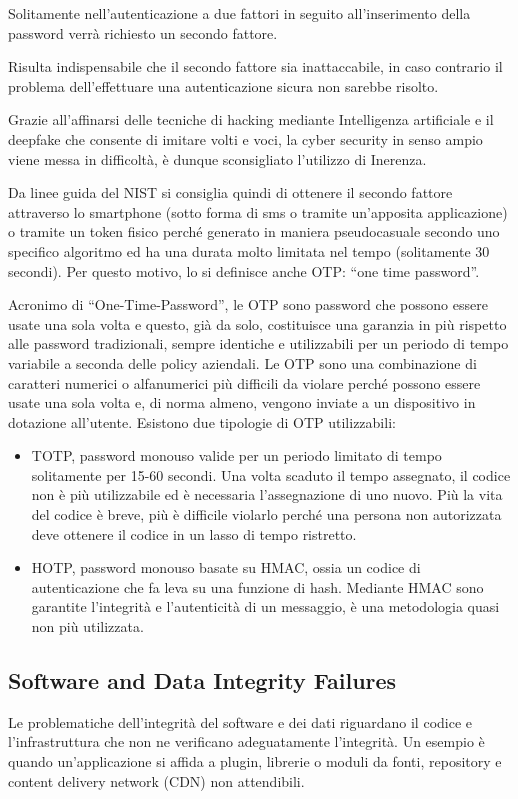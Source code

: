 Solitamente nell’autenticazione a due fattori in seguito all’inserimento della password verrà richiesto un secondo fattore. 

Risulta indispensabile che il secondo fattore sia inattaccabile, in caso contrario il problema dell’effettuare una autenticazione sicura non sarebbe risolto. 

Grazie all’affinarsi delle tecniche di hacking mediante Intelligenza artificiale e il deepfake che consente di imitare volti e voci, la cyber security in senso ampio viene messa in difficoltà, è dunque sconsigliato l’utilizzo di Inerenza.

Da linee guida del NIST si consiglia quindi di ottenere il  secondo fattore attraverso lo smartphone (sotto forma di sms o tramite un’apposita applicazione) o tramite un token fisico perché generato in maniera pseudocasuale secondo uno specifico algoritmo ed ha una durata molto limitata nel tempo (solitamente 30 secondi).  Per questo motivo, lo si definisce anche OTP: “one time password”.

Acronimo di “One-Time-Password”, le OTP sono password che possono essere usate una sola volta e questo, già da solo, costituisce una garanzia in più rispetto alle password tradizionali, sempre identiche e utilizzabili per un periodo di tempo variabile a seconda delle policy aziendali. Le OTP sono una combinazione di caratteri numerici o alfanumerici più difficili da violare perché possono essere usate una sola volta e, di norma almeno, vengono inviate a un dispositivo in dotazione all’utente.
Esistono due tipologie di OTP utilizzabili:
\begin{itemize}
    \item TOTP, password monouso valide per un periodo limitato di tempo solitamente per 15-60 secondi. Una volta scaduto il tempo assegnato, il codice non è più utilizzabile ed è necessaria l’assegnazione di uno nuovo. Più la vita del codice è breve, più è difficile violarlo perché una persona non autorizzata deve ottenere il codice in un lasso di tempo ristretto.  
    \item HOTP, password monouso basate su HMAC, ossia un codice di autenticazione che fa leva su una funzione di hash. Mediante HMAC sono garantite l’integrità e l’autenticità di un messaggio, è una metodologia quasi non più utilizzata. 
\end{itemize}
\cite{Autenticazione2fattori}
\subsection{Software and Data Integrity Failures}
Le problematiche dell'integrità del software e dei dati riguardano il codice e l'infrastruttura che non ne verificano adeguatamente l'integrità. Un esempio è quando un'applicazione si affida a plugin, librerie o moduli da fonti, repository e content delivery network (CDN) non attendibili.
